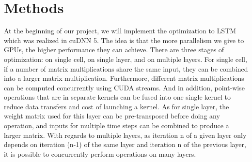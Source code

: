 \documentclass{article}
\begin{document}
\section{Methods}

At the beginning of our project, we will implement the optimization to LSTM which was realized in cuDNN 5\cite{appleyard2016optimizing}. The idea is that the more parallelism we give to GPUs, the higher performance they can achieve. There are three stages of optimization: on single cell, on single layer, and on multiple layers. For single cell, if a number of matrix multiplications share the same input, they can be combined into a larger matrix multiplication. Furthermore, different matrix multiplications can be computed concurrently using CUDA streams. And in addition, point-wise operations that are in separate kernels can be fused into one single kernel to reduce data transfers and cost of launching a kernel. As for single layer, the weight matrix used for this layer can be pre-transposed before doing any operation, and inputs for multiple time steps can be combined to produce a larger matrix. With regards to multiple layers, as iteration n of a given layer only depends on iteration (n-1) of the same layer and iteration n of the previous layer, it is possible to concurrently perform operations on many layers.

\medskip



\end{document}
